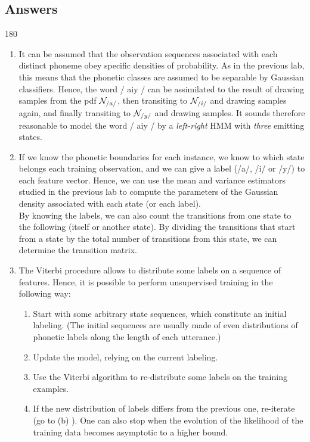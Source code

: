 \documentclass[11pt]{article}
\newenvironment{answer}{\begin{turn}{180}\begin{minipage}[t]{\linewidth}\begin{itshape}}{\end{itshape}\end{minipage}\end{turn}}
\begin{document}
\subsection{Answers}
\label{sec:org19b9f1a}
\begin{answer}
\begin{enumerate}
\item It can be assumed that the observation sequences associated with each
distinct phoneme obey specific densities of probability. As in the
previous lab, this means that the phonetic classes are assumed to be
separable by Gaussian classifiers. Hence, the word / aiy / can be
assimilated to the result of drawing samples from the pdf
\({\cal N}_{/a/}\), then transiting to \({\cal N}_{/i/}\) and drawing
samples again, and finally transiting to \({\cal N}_{/y/}\) and drawing
samples. It sounds therefore reasonable to model the word / aiy / by a
\emph{left-right} HMM with \emph{three} emitting states.
\item If we know the phonetic boundaries for each instance, we know to which
state belongs each training observation, and we can give a label (​/a​/,
​/i​/ or ​/y​/) to each feature vector. Hence, we can use the mean and
variance estimators studied in the previous lab to compute the
parameters of the Gaussian density associated with each state (or each
label).\\
By knowing the labels, we can also count the transitions from one
state to the following (itself or another state). By dividing the
transitions that start from a state by the total number of transitions
from this state, we can determine the transition matrix.
\item The Viterbi procedure allows to distribute some labels on a sequence
of features. Hence, it is possible to perform unsupervised training in
the following way:

\begin{enumerate}
\item Start with some arbitrary state sequences, which constitute an
initial labeling. (The initial sequences are usually made of even
distributions of phonetic labels along the length of each
utterance.)
\item Update the model, relying on the current labeling.
\item Use the Viterbi algorithm to re-distribute some labels on the
training examples.
\item If the new distribution of labels differs from the previous one,
re-iterate (go to (b) ). One can also stop when the evolution of
the likelihood of the training data becomes asymptotic to a higher
bound.
\end{enumerate}


\end{enumerate}
\end{answer}
\end{document}
